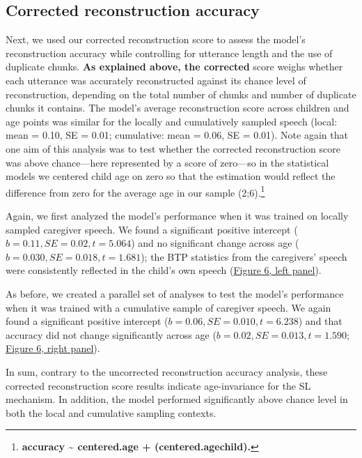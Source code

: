 \documentclass[man,mask,floatsintext]{apa6}
\let\rmarkdownfootnote\footnote%
\def\footnote{\protect\rmarkdownfootnote}
\begin{document}
\subsection{Corrected reconstruction
accuracy}\label{corrected-reconstruction-accuracy-1}

Next, we used our corrected reconstruction score to assess the model's
reconstruction accuracy while controlling for utterance length and the
use of duplicate chunks. \textbf{As explained above, the corrected}
score weighs whether each utterance was accurately reconstructed against
its chance level of reconstruction, depending on the total number of
chunks and number of duplicate chunks it contains. The model's average
reconstruction score across children and age points was similar for the
locally and cumulatively sampled speech (local: mean = 0.10, SE = 0.01;
cumulative: mean = 0.06, SE = 0.01). Note again that one aim of this
analysis was to test whether the corrected reconstruction score was
above chance---here represented by a score of zero---so in the
statistical models we centered child age on zero so that the estimation
would reflect the difference from zero for the average age in our sample
(2;6).\footnote{\textbf{accuracy \textasciitilde{} centered.age +
  (centered.age\textbar{}child).}}

Again, we first analyzed the model's performance when it was trained on
locally sampled caregiver speech. We found a significant positive
intercept (\(b = 0.11, SE = 0.02, t = 5.064\)) and no significant change
across age (\(b = 0.030, SE = 0.018, t = 1.681\)); the BTP statistics
from the caregivers' speech were consistently reflected in the child's
own speech (\protect\hyperlink{fig6}{Figure 6, left panel}).

As before, we created a parallel set of analyses to test the model's
performance when it was trained with a cumulative sample of caregiver
speech. We again found a significant positive intercept
(\(b= 0.06, SE = 0.010, t = 6.238\)) and that accuracy did not change
significantly across age (\(b=0.02, SE = 0.013, t = 1.590\);
\protect\hyperlink{fig6}{Figure 6, right panel}).

In sum, contrary to the uncorrected reconstruction accuracy analysis,
these corrected reconstruction score results indicate age-invariance for
the SL mechanism. In addition, the model performed significantly above
chance level in both the local and cumulative sampling contexts.
\end{document}
